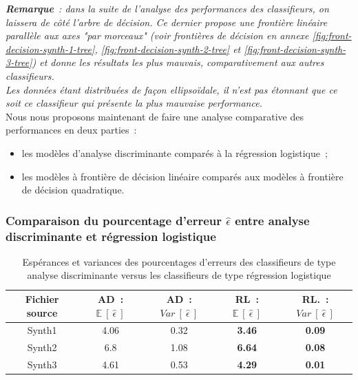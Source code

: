 \documentclass[a4paper,10pt]{report}
\begin{document}
\textit{\textbf{Remarque}~: dans la suite de l'analyse des performances des classifieurs, on laissera de côté l'arbre de décision. Ce dernier propose une frontière linéaire parallèle aux axes "par morceaux" (voir frontières de décision en annexe \autoref{fig:front-decision-synth-1-tree}, \autoref{fig:front-decision-synth-2-tree} et \autoref{fig:front-decision-synth-3-tree}) et donne les résultats les plus mauvais, comparativement aux autres classifieurs.\\
Les données étant distribuées de façon ellipsoïdale, il n'est pas étonnant que ce soit ce classifieur qui présente la plus mauvaise performance.}\\

Nous nous proposons maintenant de faire une analyse comparative des performances en deux parties~:
\begin{itemize}
	\item les modèles d'analyse discriminante comparés à la régression logistique~;
	\item les modèles à frontière de décision linéaire comparés aux modèles à frontière de décision quadratique.
\end{itemize}

\subsubsection{Comparaison du pourcentage d'erreur $\hat{\epsilon}$ entre analyse discriminante et régression logistique}

\begin{table}[H]
	\centering
	\captionsetup{justification=centering, margin=3cm}
	\begin{tabular}{c|c|c|c|c}
		Fichier source & AD~: $\mathbb{E}\ [\ \hat{\epsilon}\ ]$ & AD~: $Var\ [\ \hat{\epsilon}\ ]$ & RL~: $\mathbb{E}\ [\ \hat{\epsilon}\ ]$ & RL.~: $Var\ [\ \hat{\epsilon}\ ]$ \\ 
		\hline
		Synth1 & 4.06  & 0.32  & \textbf{3.46}  & \textbf{0.09}  \\ 
		Synth2 & 6.8  & 1.08 & \textbf{6.64}  & \textbf{0.08} \\ 
		Synth3 & 4.61 & 0.53 & \textbf{4.29}  & \textbf{0.01}  \\ 
	\end{tabular}
	\caption{\small Espérances et variances des pourcentages d'erreurs des classifieurs de type analyse discriminante versus les classifieurs de type régression logistique}
	\label{table:2-1-erreur-data-synth-mean-var-ad-vs-regression}
\end{table}
\end{document}
